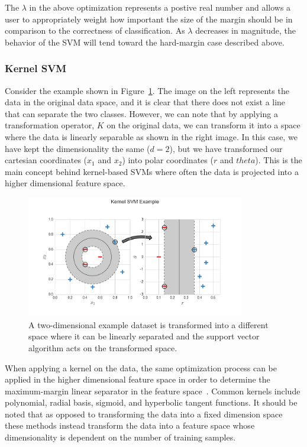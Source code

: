 \documentclass[12pt]{article}
\begin{document}
The $\lambda$ in the above optimization represents a postive real number and
allows a user to appropriately weight how important the size of the margin
should be in comparison to the correctness of classification.
%
As $\lambda$ decreases in magnitude, the behavior of the SVM will tend toward
the hard-margin case described above.

\subsubsection{Kernel SVM}

Consider the example shown in Figure~\ref{fig:kernelSvmExample}.
%
The image on the left represents the data in the original data space, and it is
clear that there does not exist a line that can separate the two classes.
%
However, we can note that by applying a transformation operator, $K$ on the
original data, we can transform it into a space where the data is linearly
separable as shown in the right image.
%
In this case, we have kept the dimensionality the same ($d=2$), but we have
transformed our cartesian coordinates ($x_1$ and $x_2$) into polar coordinates
($r$ and $theta$).
%
This is the main concept behind kernel-based SVMs where often the data is
projected into a higher dimensional feature space.

\begin{figure}[!ht]
  \centering
  \includegraphics[width=0.85\textwidth]{figs/chap3/kernelSvmExample}
  \caption[Kernel Support Vector Machine Example]{A two-dimensional example
  dataset is transformed into a different space where it can be linearly
  separated and the support vector algorithm acts on the transformed space.}
  \label{fig:kernelSvmExample}
\end{figure}

When applying a kernel on the data, the same optimization process can be applied
in the higher dimensional feature space in order to determine the maximum-margin
linear separator in the feature space~\cite{BoserGuyonVapnik1992}.
%
Common kernels include polynomial, radial basis, sigmoid, and hyperbolic tangent
functions.
%
It should be noted that as opposed to transforming the data into a fixed
dimension space these methods instead transform the data into a feature space
whose dimensionality is dependent on the number of training samples.
\end{document}
